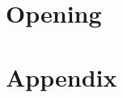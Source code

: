 \part{Opening}


\cleardoublepage




























\cleardoublepage





\part{Appendix} %




